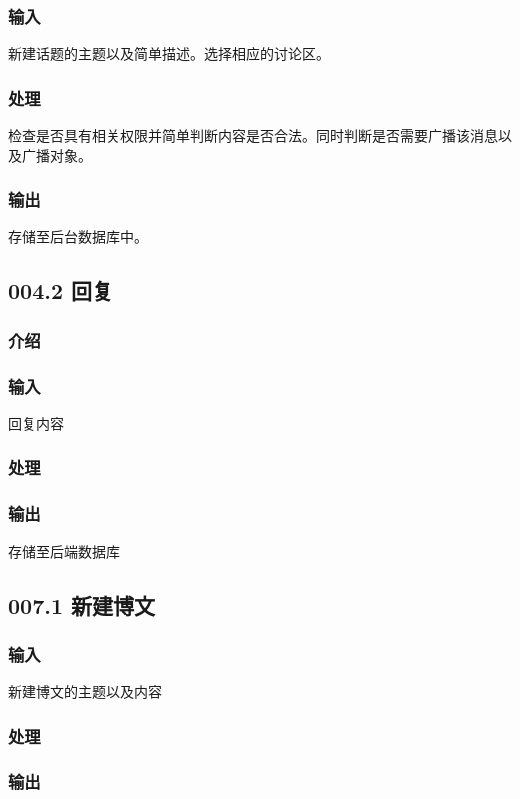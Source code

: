     \subsubsection{输入}
    新建话题的主题以及简单描述。选择相应的讨论区。
    \subsubsection{处理}
    检查是否具有相关权限并简单判断内容是否合法。同时判断是否需要广播该消息以及广播对象。
    \subsubsection{输出}
    存储至后台数据库中。

  \subsection{004.2 回复}
    \subsubsection{介绍}

    \subsubsection{输入}
    回复内容
    \subsubsection{处理}

    \subsubsection{输出}
    存储至后端数据库

  \subsection{007.1 新建博文}
    \subsubsection{输入}
    新建博文的主题以及内容
    \subsubsection{处理}
    \subsubsection{输出}

